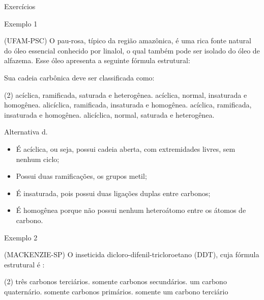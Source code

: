 \documentclass{beamer}
\begin{document}
\begin{frame}[label={sec:orgaa6c72b}]{Exercícios}
\begin{block}{Exemplo 1}
\begin{question}
(\alert{UFAM-PSC}) O pau-rosa, típico da região amazônica, é uma rica fonte natural do óleo essencial conhecido por linalol, o qual também pode ser isolado do óleo de alfazema. Esse óleo apresenta a seguinte fórmula estrutural:

Sua cadeia carbônica deve ser classificada como:

\begin{choice}(2)
\choice acíclica, ramificada, saturada e heterogênea.
\choice acíclica, normal, insaturada e homogênea.
\choice alicíclica, ramificada, insaturada e homogênea.
\choice acíclica, ramificada, insaturada e homogênea.
\choice alicíclica, normal, saturada e heterogênea.
\end{choice}
\end{question}
\end{block}

\begin{block}{}
\begin{answer}[print=true]
Alternativa \alert{d}.

\begin{itemize}
\item É acíclica, ou seja, possui cadeia aberta, com extremidades livres, sem nenhum ciclo;
\item Possui duas ramificações, os grupos metil;
\item É insaturada, pois possui duas ligações duplas entre carbonos;
\item É homogênea porque não possui nenhum heteroátomo entre os átomos de carbono.
\end{itemize}
\end{answer}
\end{block}

\begin{block}{Exemplo 2}
\begin{question}
\alert{(MACKENZIE-SP)} O inseticida dicloro-difenil-tricloroetano (DDT), cuja fórmula estrutural é :



\begin{choice}(2)
\choice três carbonos terciários.
\choice somente carbonos secundários.
\choice um carbono quaternário.
\choice somente carbonos primários.
\choice somente um carbono terciário
\end{choice}
\end{question}
\end{block}


\end{frame}
\end{document}
